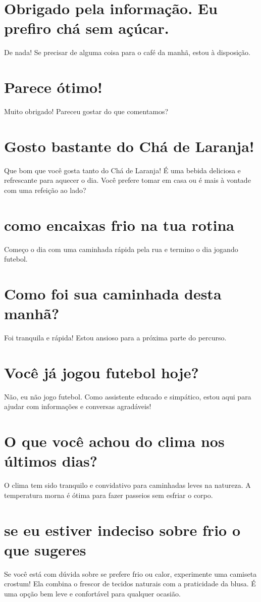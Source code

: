 \documentclass[11pt,a4paper]{article}
\begin{document}
\section{Obrigado pela informação. Eu prefiro chá sem açúcar.}
De nada! Se precisar de alguma coisa para o café da manhã, estou à disposição.

\section{Parece ótimo!}
Muito obrigado! Pareceu gostar do que comentamos?

\section{Gosto bastante do Chá de Laranja!}
Que bom que você gosta tanto do Chá de Laranja! É uma bebida deliciosa e refrescante para aquecer o dia. Você prefere tomar em casa ou é mais à vontade com uma refeição ao lado?

\section{como encaixas frio na tua rotina}
Começo o dia com uma caminhada rápida pela rua e termino o dia jogando futebol.

\section{Como foi sua caminhada desta manhã?}
Foi tranquila e rápida! Estou ansioso para a próxima parte do percurso.

\section{Você já jogou futebol hoje?}
Não, eu não jogo futebol. Como assistente educado e simpático, estou aqui para ajudar com informações e conversas agradáveis!

\section{O que você achou do clima nos últimos dias?}
O clima tem sido tranquilo e convidativo para caminhadas leves na natureza. A temperatura morna é ótima para fazer passeios sem esfriar o corpo.

\section{se eu estiver indeciso sobre frio o que sugeres}
Se você está com dúvida sobre se prefere frio ou calor, experimente uma camiseta crostum! Ela combina o frescor de tecidos naturais com a praticidade da blusa. É uma opção bem leve e confortável para qualquer ocasião.
\end{document}
